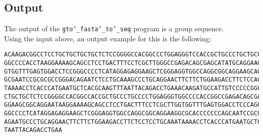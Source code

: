 \subsection*{Output}

The output of the \texttt{gto\char`_fasta\char`_to\char`_seq} program is a group sequence. \\
Using the input above, an output example for this is the following:
\begin{lstlisting}
ACAAGACGGCCTCCTGCTGCTGCTGCTCTCCGGGGCCACGGCCCTGGAGGGTCCACCGCTGCCCTGCTGCCATTGTCCCC
GGCCCCACCTAAGGAAAAGCAGCCTCCTGACTTTCCTCGCTTGGGCCGAGACAGCGAGCATATGCAGGAAGCGGCAGGAA
GTGGTTTGAGTGGACCTCCGGGCCCCTCATAGGAGAGGAAGCTCGGGAGGTGGCCAGGCGGCAGGAAGCAGGCCAGTGCC
GCGAATCCGCGCGCCGGGACAGAATCTCCTGCAAAGCCCTGCAGGAACTTCTTCTGGAAGACCTTCTCCACCCCCCCAGC
TAAAACCTCACCCATGAATGCTCACGCAAGTTTAATTACAGACCTGAAACAAGATGCCATTGTCCCCCGGCCTCCTGCTG
CTGCTGCTCTCCGGGGCCACGGCCACCGCTGCCCTGCCCCTGGAGGGTGGCCCCACCGGCCGAGACAGCGAGCATATGCA
GGAAGCGGCAGGAATAAGGAAAAGCAGCCTCCTGACTTTCCTCGCTTGGTGGTTTGAGTGGACCTCCCAGGCCAGTGCCG
GGCCCCTCATAGGAGAGGAAGCTCGGGAGGTGGCCAGGCGGCAGGAAGGCGCACCCCCCCAGCAATCCGCGCGCCGGGAC
AGAATGCCCTGCAGGAACTTCTTCTGGAAGACCTTCTCCTCCTGCAAATAAAACCTCACCCATGAATGCTCACGCAAGTT
TAATTACAGACCTGAA
\end{lstlisting}

